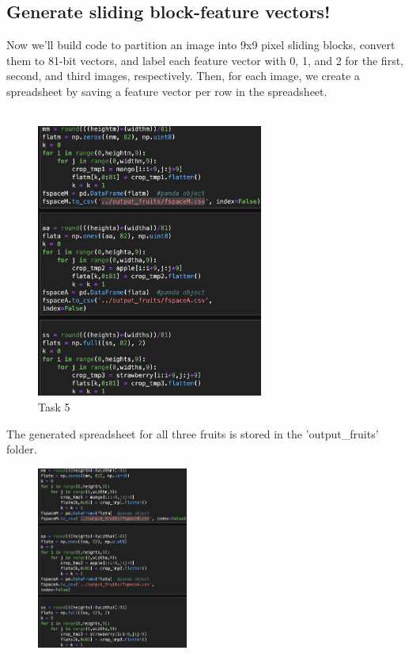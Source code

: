 \documentclass[conference]{IEEEtran}
\begin{document}
\subsection{Generate sliding block-feature vectors!}
Now we'll build code to partition an image into 9x9 pixel sliding blocks, convert them to 81-bit vectors, and label each feature vector with 0, 1, and 2 for the first, second, and third images, respectively. Then, for each image, we create a spreadsheet by saving a feature vector per row in the spreadsheet. \\\\
\begin{figure}[!htbp]
    \centering
    \includegraphics[height=9cm]{task6.png} 
    \caption{Task 5 }
  \label{fig:mangoGray-Resized }
    
\end{figure}

The generated spreadsheet for all three fruits is stored in the 'output_fruits' folder.\\
\begin{figure}[!htbp]
    \centering
    \includegraphics[height=6cm]{Task6.png} 
   
    \label{fig:my_label}
\end{figure}
\end{document}
